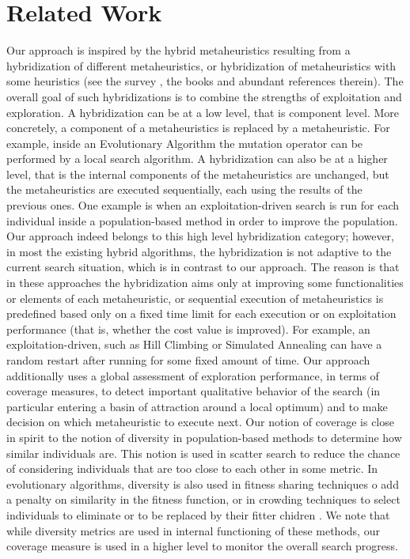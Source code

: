\section{Related Work}
Our approach is inspired by the hybrid metaheuristics resulting from a hybridization of different metaheuristics, or hybridization of metaheuristics with some heuristics (see the survey \cite{Talbi2009}, the books \cite{Lones2011,Talbi2013,Talbi2014} and abundant references therein). The overall goal of such hybridizations is to combine the strengths of exploitation and exploration. A hybridization can be at a low level, that is component level. More concretely, a component of a metaheuristics is replaced by a metaheuristic. For example, inside an Evolutionary Algorithm the mutation operator can be performed by a local search algorithm. A hybridization can also be at a higher level, that is the internal components of the metaheuristics are unchanged, but the metaheuristics are executed sequentially, each using the results of the previous ones. One example is when an exploitation-driven search is run for each individual inside a population-based method in order to improve the population. Our approach indeed belongs to this high level hybridization category; however, in most the existing hybrid algorithms, the hybridization is not adaptive to the current search situation, which is in contrast to our approach. The reason is that in these approaches the hybridization aims only at improving some functionalities or elements of each metaheuristic, or sequential execution of metaheuristics is predefined based only on a fixed time limit for each execution or on exploitation performance (that is, whether the cost value is improved). For example, an exploitation-driven, such as Hill Climbing or Simulated Annealing can have a random restart after running for some fixed amount of time. Our approach additionally uses a global assessment of exploration performance, in terms of coverage measures, to detect important qualitative behavior of the search (in particular entering a basin of attraction around a local optimum) and to make decision on which metaheuristic to execute next. Our notion of coverage is close in spirit to the notion of diversity in population-based methods to determine how similar individuals are. This notion is used in scatter search \cite{Glover2011} to reduce the chance of considering individuals that are too close to each other in some metric. In evolutionary algorithms, diversity is also used in fitness sharing techniques o add a penalty on similarity in the fitness function, or in crowding techniques to select individuals to eliminate or to be replaced by their fitter chidren \cite{WongWMPZ2012}. We note that while diversity metrics are used in internal functioning of these methods, our coverage measure is used in a higher level to monitor the overall search progress.
